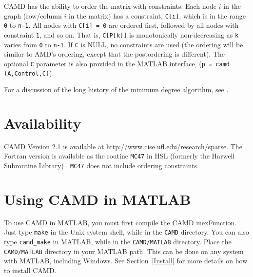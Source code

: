 \documentclass[11pt]{article}
\begin{document}
CAMD has the ability to order the matrix with constraints.  Each
node $i$ in the graph (row/column $i$ in the matrix) has a constraint,
{\tt C[i]}, which is in the range {\tt 0} to {\tt n-1}.  All nodes with
{\tt C[i] = 0} are
ordered first, followed by all nodes with constraint {\tt 1}, and so on.
That is, {\tt C[P[k]]} is monotonically non-decreasing as {\tt k} varies from
{\tt 0} to {\tt n-1}.  If {\tt C} is NULL, no
constraints are used (the ordering will be similar to AMD's ordering,
except that the postordering is different).
The optional {\tt C} parameter is also provided in the MATLAB interface,
({\tt p = camd (A,Control,C)}).

For a discussion of the long history of the minimum degree algorithm,
see \cite{GeorgeLiu89}.

\section{Availability}

CAMD Version 2.1 is available at http://www.cise.ufl.edu/research/sparse.
The Fortran version is available as the routine {\tt MC47} in HSL
(formerly the Harwell Subroutine Library) \cite{hsl:2002}. {\tt MC47} does
not include ordering constraints.

\section{Using CAMD in MATLAB}

To use CAMD in MATLAB, you must first compile the CAMD mexFunction.
Just type {\tt make} in the Unix system shell, while in the {\tt CAMD}
directory.  You can also type {\tt camd\_make} in MATLAB, while in the
{\tt CAMD/MATLAB} directory.  Place the {\tt CAMD/MATLAB} directory in your
MATLAB path.  This can be done on any system with MATLAB, including Windows.
See Section~\ref{Install} for more details on how to install CAMD.
\end{document}
